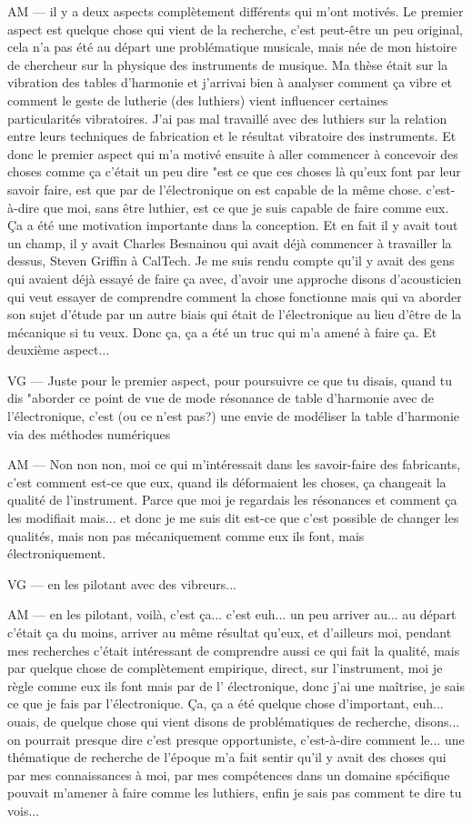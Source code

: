 AM — il y a deux aspects complètement différents qui m'ont motivés. Le premier aspect est quelque chose qui vient de la recherche, c'est peut-être un peu original, cela n'a pas été au départ une problématique musicale, mais née de mon histoire de chercheur sur la physique des instruments de musique. Ma thèse était sur la vibration des tables d'harmonie et j'arrivai bien à analyser comment ça vibre et comment le geste de lutherie (des luthiers) vient influencer certaines particularités vibratoires. J'ai pas mal travaillé avec des luthiers sur la relation entre leurs techniques de fabrication et le résultat vibratoire des instruments.
Et donc le premier aspect qui m'a motivé ensuite à aller commencer à concevoir des choses comme ça c'était un peu dire "est ce que ces choses là qu'eux font par leur savoir faire, est que par de l'électronique on est capable de la même chose. c'est-à-dire que moi, sans être luthier, est ce que je suis capable de faire comme eux. Ça a été une motivation importante dans la conception. Et en fait il y avait tout un champ, il y avait Charles Besnainou qui avait déjà commencer à travailler la dessus, Steven Griffin à CalTech. 
Je me suis rendu compte qu'il y avait des gens qui avaient déjà essayé de faire ça avec, d'avoir une approche disons d'acousticien qui veut essayer de comprendre comment la chose fonctionne mais qui va aborder son sujet d'étude par un autre biais qui était de l'électronique au lieu d'être de la mécanique si tu veux. 
Donc ça, ça a été un truc qui m'a amené à faire ça. Et deuxième aspect... 

VG — Juste pour le premier aspect, pour poursuivre ce que tu disais, quand tu dis "aborder ce point de vue de mode résonance de table d'harmonie avec de l'électronique, c'est (ou ce n'est pas?) une envie de modéliser la table d'harmonie via des méthodes numériques

AM — Non non non, moi ce qui m'intéressait dans les savoir-faire des fabricants, c'est comment  est-ce que eux, quand ils déformaient les choses, ça changeait la qualité de l'instrument. Parce que moi je regardais les résonances et comment ça les modifiait mais... et donc je me suis dit est-ce que c'est possible de changer les qualités, mais non pas mécaniquement comme eux ils font, mais électroniquement.

VG — en les pilotant avec des vibreurs... 

AM — en les pilotant, voilà, c'est ça... c'est euh... un peu arriver au... au départ c'était ça du moins, arriver au même résultat qu'eux, et d'ailleurs moi, pendant mes recherches c'était intéressant de comprendre aussi ce qui fait la qualité, mais par quelque chose de complètement empirique, direct, sur l'instrument, moi je règle comme eux ils font mais par de l' électronique, donc j'ai une maîtrise, je sais ce que je fais par l'électronique.
Ça, ça a été quelque chose d'important, euh... ouais, de quelque chose qui vient disons de problématiques de recherche, disons... on pourrait presque dire c'est presque opportuniste, c'est-à-dire comment le... une thématique de recherche de l'époque m'a fait sentir qu'il y avait des choses qui par mes connaissances à moi, par mes compétences dans un domaine spécifique pouvait m'amener à faire comme les luthiers, enfin je sais pas comment te dire tu vois... 

